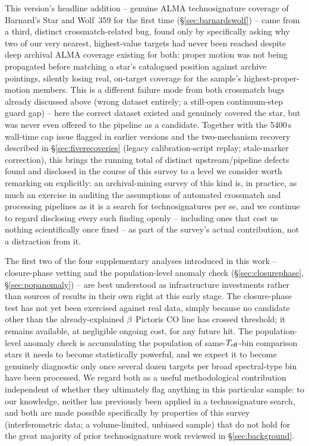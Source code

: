 \documentclass{openjournal}
\begin{document}
This version's headline addition -- genuine ALMA technosignature coverage
of Barnard's Star and Wolf~359 for the first time (\S\ref{sec:barnardswolf})
-- came from a third, distinct crossmatch-related bug, found only by
specifically asking why two of our very nearest, highest-value targets
had never been reached despite deep archival ALMA coverage existing for
both: proper motion was not being propagated before matching a star's
catalogued position against archive pointings, silently losing real,
on-target coverage for the sample's highest-proper-motion members. This
is a different failure mode from both crossmatch bugs already discussed
above (wrong dataset entirely; a still-open continuum-step guard gap) --
here the correct dataset existed and genuinely covered the star, but was
never even offered to the pipeline as a candidate. Together with the
5400\,s wall-time cap issue flagged in earlier versions and the
two-mechanism recovery described in \S\ref{sec:fiverecoveries} (legacy
calibration-script replay; stale-marker correction), this brings the
running total of distinct upstream/pipeline defects found and disclosed
in the course of this survey to a level we consider worth remarking on
explicitly: an archival-mining survey of this kind is, in practice, as
much an exercise in auditing the assumptions of automated crossmatch and
processing pipelines as it is a search for technosignatures per se, and
we continue to regard disclosing every such finding openly -- including
ones that cost us nothing scientifically once fixed -- as part of the
survey's actual contribution, not a distraction from it.

The first two of the four supplementary analyses introduced in this work
-- closure-phase vetting and the population-level anomaly check
(\S\ref{sec:closurephase}, \S\ref{sec:popanomaly}) -- are best understood
as infrastructure investments rather than sources of results in their
own right at this early stage. The closure-phase test has not yet been
exercised against real data, simply because no candidate other than the
already-explained $\beta$~Pictoris CO line has crossed threshold; it
remains available, at negligible ongoing cost, for any future hit. The
population-level anomaly check is accumulating the population of
same-$T_{\rm eff}$-bin comparison stars it needs to become statistically
powerful, and we expect it to become genuinely diagnostic only once
several dozen targets per broad spectral-type bin have been processed.
We regard both as a useful methodological contribution independent of
whether they ultimately flag anything in this particular sample: to our
knowledge, neither has previously been applied in a technosignature
search, and both are made possible specifically by properties of this
survey (interferometric data; a volume-limited, unbiased sample) that do
not hold for the great majority of prior technosignature work reviewed in
\S\ref{sec:background}.
\end{document}
